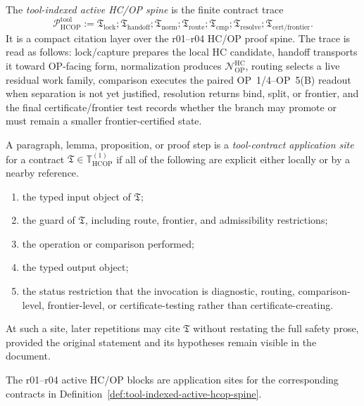 \begin{definition}
\label{def:tool-indexed-active-hcop-spine}
The \emph{tool-indexed active HC/OP spine} is the finite contract trace
\[
  \mathcal P_{\mathrm{HCOP}}^{\mathrm{tool}}
  :=
  \mathfrak T_{\mathrm{lock}}
  ;\mathfrak T_{\mathrm{handoff}}
  ;\mathfrak T_{\mathrm{norm}}
  ;\mathfrak T_{\mathrm{route}}
  ;\mathfrak T_{\mathrm{cmp}}
  ;\mathfrak T_{\mathrm{resolve}}
  ;\mathfrak T_{\mathrm{cert/frontier}} .
\]
It is a compact citation layer over the r01--r04 HC/OP proof spine. The trace is read as follows: lock/capture prepares the local HC candidate, handoff transports it toward OP-facing form, normalization produces \(\mathcal N_{\mathrm{OP}}^{\mathrm{HC}}\), routing selects a live residual work family, comparison executes the paired OP~1/4--OP~5(B) readout when separation is not yet justified, resolution returns bind, split, or frontier, and the final certificate/frontier test records whether the branch may promote or must remain a smaller frontier-certified state.
\end{definition}

\begin{definition}
\label{def:tool-contract-application-site}
A paragraph, lemma, proposition, or proof step is a \emph{tool-contract application site} for a contract \(\mathfrak T\in\mathbb T_{\mathrm{HCOP}}^{(1)}\) if all of the following are explicit either locally or by a nearby reference.
\begin{enumerate}[leftmargin=2em,label=(\roman*)]
  \item the typed input object of \(\mathfrak T\);
  \item the guard of \(\mathfrak T\), including route, frontier, and admissibility restrictions;
  \item the operation or comparison performed;
  \item the typed output object;
  \item the status restriction that the invocation is diagnostic, routing, comparison-level, frontier-level, or certificate-testing rather than certificate-creating.
\end{enumerate}
At such a site, later repetitions may cite \(\mathfrak T\) without restating the full safety prose, provided the original statement and its hypotheses remain visible in the document.
\end{definition}

\begin{lemma}
\label{lem:active-hcop-blocks-are-contract-application-sites}
The r01--r04 active HC/OP blocks are application sites for the corresponding contracts in Definition~\ref{def:tool-indexed-active-hcop-spine}.
\end{lemma}

